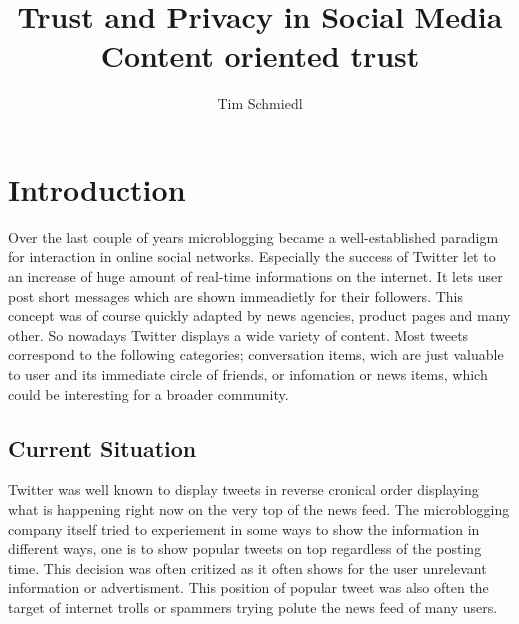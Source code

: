 \documentclass{proseminar}
\begin{document}

\title{Trust and Privacy in Social Media \\
\huge Content oriented trust}

\author{
Tim Schmiedl\\
}

\maketitle

\section{Introduction}
Over the last couple of years microblogging became a well-established paradigm for interaction in online social networks.
Especially the success of Twitter let to an increase of huge amount of real-time informations on the internet. It lets user post short messages which are shown immeadietly for their followers. This concept was of course quickly adapted by news agencies, product pages and many other. So nowadays Twitter displays a wide variety of content. Most tweets correspond to the following categories; conversation items, wich are just valuable to user and its immediate circle of friends, or infomation or news items, which could be interesting for a broader community.



\subsection*{Current Situation}
Twitter was well known to display tweets in reverse cronical order displaying what is happening right now on the very top of the news feed. 
The microblogging company itself tried to experiement in some ways to show the information in different ways, one is to show popular tweets on top regardless of the posting time.
This decision was often critized as it often shows for the user unrelevant information or advertisment. This position of popular tweet was also often the target of internet trolls or spammers trying polute the news feed of many users.
\end{document}

